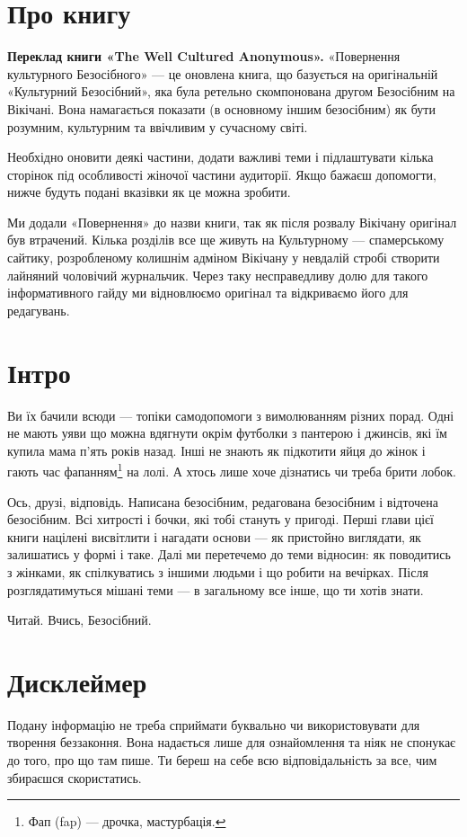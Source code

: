 \setcounter{page}{2}
\section*{Про книгу}
\textbf{Переклад книги «The Well Cultured Anonymous».}
«Повернення культурного Безосібного» — це оновлена книга, що базується на
оригінальній «Культурний Безосібний», яка була ретельно скомпонована другом
Безосібним на Вікічані. Вона намагається показати (в основному іншим
безосібним) як бути розумним, культурним та ввічливим у сучасному світі.

Необхідно оновити деякі частини, додати важливі теми і підлаштувати кілька
сторінок під особливості жіночої частини аудиторії. Якщо бажаєш допомогти,
нижче будуть подані вказівки як це можна зробити.

Ми додали «Повернення» до назви книги, так як після розвалу Вікічану оригінал
був втрачений. Кілька розділів все ще живуть на Культурному — спамерському
сайтику, розробленому колишнім адміном Вікічану у невдалій стробі створити
лайняний чоловічий журнальчик. Через таку несправедливу долю для такого
інформативного гайду ми відновлюємо оригінал та відкриваємо його для редагувань.

\section*{Інтро}
Ви їх бачили всюди — топіки самодопомоги з вимолюванням різних порад. Одні не
мають уяви що можна вдягнути окрім футболки з пантерою і джинсів, які їм
купила мама п’ять років назад. Інші не знають як підкотити яйця до жінок і
гають час фапанням\footnote{Фап (fap) — дрочка, мастурбація.} на лолі. А хтось
лише хоче дізнатись чи треба брити лобок.

Ось, друзі, відповідь. Написана безосібним, редагована безосібним і відточена
безосібним. Всі хитрості і бочки, які тобі стануть у пригоді. Перші глави
цієї книги націлені висвітлити і нагадати основи — як пристойно виглядати,
як залишатись у формі і таке. Далі ми перетечемо до теми відносин: як поводитись
з жінками, як спілкуватись з іншими людьми і що робити на вечірках. Після
розглядатимуться мішані теми — в загальному все інше, що ти хотів знати.

Читай. Вчись, Безосібний.

\section*{Дисклеймер}
Подану інформацію не треба сприймати буквально чи використовувати для
творення беззаконня. Вона надається лише для ознайомлення та ніяк не
спонукає до того, про що там пише. Ти береш на себе всю відповідальність за
все, чим збираєшся скористатись.


